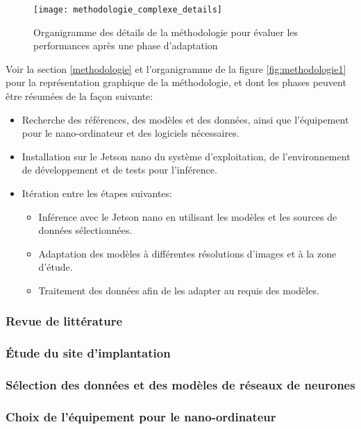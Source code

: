 \label{methodologie_complexe_details}
\begin{figure}
    \centering
    \texttt{[image: methodologie\_complexe\_details]}
    \caption{Organigramme des détails de la méthodologie pour évaluer les performances après une phase d'adaptation}
    \label{fig:methodologie_complexe_details}
\end{figure}
\par Voir la section \ref{methodologie} et l'organigramme de la figure \ref{fig:methodologie1} pour la représentation graphique de la méthodologie, et dont les phases peuvent être résumées de la façon suivante:  
\begin{itemize}
   \item Recherche des références, des modèles et des données, ainsi que l'équipement pour le nano-ordinateur et des logiciels nécessaires.
   \item Installation sur le Jetson nano du système d'exploitation, de l'environnement de développement et de tests pour l'inférence.
   \item Itération entre les étapes suivantes:
   \begin{itemize}
      \item Inférence avec le Jetson nano en utilisant les modèles et les sources de données sélectionnées.
      \item Adaptation des modèles à différentes résolutions d'images et à la zone d'étude.
      \item Traitement des données afin de les adapter au requis des modèles.
   \end{itemize}
\end{itemize}
\subsubsection{Revue de littérature}

\subsubsection{Étude du site d'implantation}

\subsubsection{Sélection des données et des modèles de réseaux de neurones}

\subsubsection{Choix de l'équipement pour le nano-ordinateur}

